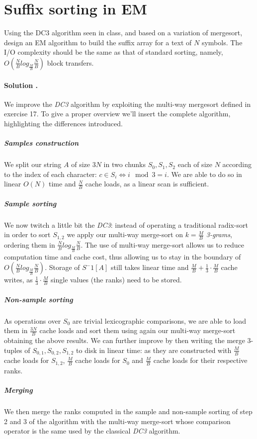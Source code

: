 \section{Suffix sorting in EM}
Using the DC3 algorithm seen in class, and based on a variation of mergesort, design an EM algorithm to build the suffix array for a text of $N$ symbols.
The I/O complexity should be the same as that of standard sorting, namely, $O(\frac{N}{B} log_{\frac{M}{B}} \frac{N}{B})$ block transfers.

\vspace{0.5cm}
\paragraph{Solution .}
We improve the \emph{DC3} algorithm by exploiting the multi-way mergesort defined in exercise 17.
To give a proper overview we'll insert the complete algorithm, highlighting the differences introduced.

\subparagraph{Samples construction}
We split our string $A$ of size $3N$ in two chunks $S_0, S_1, S_2$ each of size $N$ according to the index of each character: $c \in S_i \iff i \mod 3 = i$.
We are able to do so in linear $O(N)$ time and $\frac{N}{B}$ cache loads, as a linear scan is sufficient.

\subparagraph{Sample sorting}
We now twitch a little bit the \emph{DC3}: instead of operating a traditional radix-sort in order to sort $S_{1,2}$ we apply our multi-way merge-sort on $k = \frac{M}{B}$ \emph{3-grams}, ordering them in $\frac{N}{B} log_{\frac{M}{B}} \frac{N}{B}$.
The use of multi-way merge-sort allows us to reduce computation time and cache cost, thus allowing us to stay in the boundary of $O(\frac{N}{B} log_{\frac{M}{B}} \frac{N}{B})$.
Storage of $S^-1[A]$ still takes linear time and $\frac{M}{B} + \frac{1}{3} \cdot \frac{M}{B}$ cache writes, as $\frac{1}{3} \cdot \frac{M}{B}$ single values (the ranks) need to be stored.

\subparagraph{Non-sample sorting}
As operations over $S_0$ are trivial lexicographic comparisons, we are able to load them in $\frac{3N}{B}$ cache loads and sort them using again our multi-way merge-sort obtaining the above results.
We can further improve by then writing the merge 3-tuples of $S_{0,1}, S_{0,2}, S_{1,2}$ to disk in linear time: as they are constructed with $\frac{M}{B}$ cache loads for $S_{1,2}$, $\frac{M}{B}$ cache loads for $S_{0}$ and $\frac{M}{B}$ cache loads for their respective ranks.

\subparagraph{Merging}
We then merge the ranks computed in the sample and non-sample sorting of step 2 and 3 of the algorithm with the multi-way merge-sort whose comparison operator is the same used by the classical \emph{DC3} algorithm.